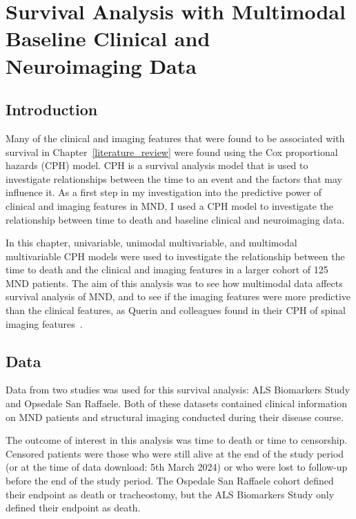 \chapter{Survival Analysis with Multimodal Baseline Clinical and Neuroimaging Data}
\label{cox_proportional_hazards_model}

\section{Introduction}

Many of the clinical and imaging features that were found to be associated with survival in Chapter~\ref{literature_review} were found using the Cox proportional hazards (CPH) model.
CPH is a survival analysis model that is used to investigate relationships between the time to an event and the factors that may influence it.
As a first step in my investigation into the predictive power of clinical and imaging features in MND, I used a CPH model to investigate the relationship between time to death and baseline clinical and neuroimaging data.

In this chapter, univariable, unimodal multivariable, and multimodal multivariable CPH models were used to investigate the relationship between the time to death and the clinical and imaging features in a larger cohort of 125 MND patients.
The aim of this analysis was to see how multimodal data affects survival analysis of MND, and to see if the imaging features were more predictive than the clinical features, as Querin and colleagues found in their CPH of spinal imaging features~\cite{querinSpinalCordMultiparametric2017}.

\section{Data}

Data from two studies was used for this survival analysis: ALS Biomarkers Study and Opsedale San Raffaele.
Both of these datasets contained clinical information on MND patients and structural imaging conducted during their disease course.

The outcome of interest in this analysis was time to death or time to censorship.
Censored patients were those who were still alive at the end of the study period (or at the time of data download: 5th March 2024) or who were lost to follow-up before the end of the study period.
The Ospedale San Raffaele cohort defined their endpoint as death or tracheostomy, but the ALS Biomarkers Study only defined their endpoint as death.

